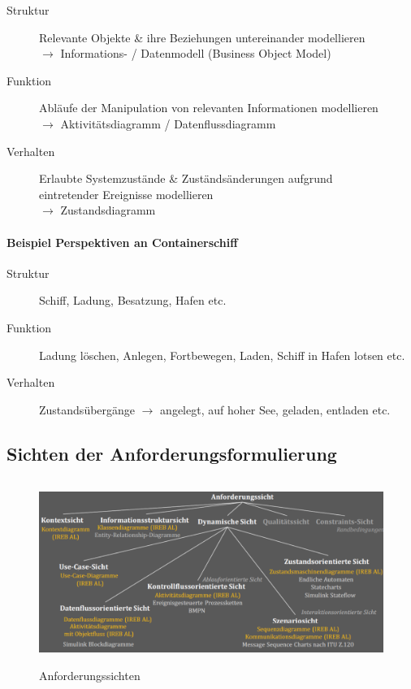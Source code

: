 \documentclass[a4paper]{article}
\begin{document}
		\begin{description}
			\item[Struktur] Relevante Objekte \& ihre Beziehungen untereinander modellieren\\
				$\rightarrow$ Informations- / Datenmodell (Business Object Model)
			\item[Funktion] Abläufe der Manipulation von relevanten Informationen modellieren\\
				$\rightarrow$ Aktivitätsdiagramm / Datenflussdiagramm
			\item[Verhalten] Erlaubte Systemzustände \& Zuständsänderungen aufgrund \\
					eintretender Ereignisse modellieren\\
				$\rightarrow$ Zustandsdiagramm
		\end{description}
	
				\paragraph{Beispiel Perspektiven an Containerschiff}
				
				\begin{description}
					\item[Struktur] Schiff, Ladung, Besatzung, Hafen etc.
					\item[Funktion] Ladung löschen, Anlegen, Fortbewegen, Laden, Schiff in Hafen lotsen etc.
					\item[Verhalten] Zustandsübergänge $\rightarrow$ angelegt, auf hoher See, geladen, entladen etc.
				\end{description}
	
		\subsection{Sichten der Anforderungsformulierung}
		
			\begin{figure}[!htb]
				\centering
				\includegraphics[height=6cm]{img/re/03/anforderungssichten.png}
				\caption{Anforderungssichten}
				\label{fig:re_anforderungssichten}
			\end{figure}
	
\end{document}

